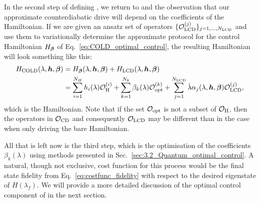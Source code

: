 In the second step of defining , we return to  and the observation that our approximate counterdiabatic drive will depend on the coefficients of the Hamiltonian. If we are given an ansatz set of operators $\{\mathcal{O}_{\rm LCD}^{(j)}\}_{j = 1, ..., N_{\rm LCD}}$ and use them to variationally determine the approximate  protocol for the control Hamiltonian $H_{\boldsymbol{\beta}}$ of Eq.~\eqref{eq:COLD_optimal_control}, the resulting Hamiltonian will look something like this:
\begin{equation}\label{eq:COLD_Hamiltonian}
    \begin{aligned}
        H_{\rm COLD}(\lambda, \boldsymbol{h}, \boldsymbol{\beta}) &= H_{\boldsymbol{\beta}}(\lambda, \boldsymbol{h}, \boldsymbol{\beta}) + H_{\rm LCD}(\lambda, \boldsymbol{h}, \boldsymbol{\beta}) \\
        &= \sum_{i = 1}^{N_H} h_i(\lambda) \mathcal{O}_{\rm H}^{(i)} + \sum_{k = 1}^{N_k} \beta_k(\lambda) \mathcal{O}_{\rm opt}^{(k)} + \sum_{j = 1}^{N_{\rm LCD}} \dot{\lambda} \alpha_{j}(\lambda, \boldsymbol{h}, \boldsymbol{\beta}) \mathcal{O}_{\rm LCD}^{(j)},
    \end{aligned}
\end{equation}
which is the  Hamiltonian. Note that if the set $\mathcal{O}_{\rm opt}$ is not a subset of $\mathcal{O}_{\rm H}$, then the operators in $\mathcal{O}_{\rm CD}$ and consequently $\mathcal{O}_{\rm LCD}$ may be different than in the case when only driving the bare Hamiltonian. 

All that is left now is the third  step, which is the optimisation of the coefficients $\beta_k(\lambda)$ using  methods presented in Sec.~\ref{sec:3.2_Quantum_optimal_control}. A natural, though not exclusive, cost function for this process would be the final state fidelity from Eq.~\eqref{eq:costfunc_fidelity} with respect to the desired eigenstate of $H(\lambda_f)$. We will provide a more detailed discussion of the optimal control component of  in the next section.

